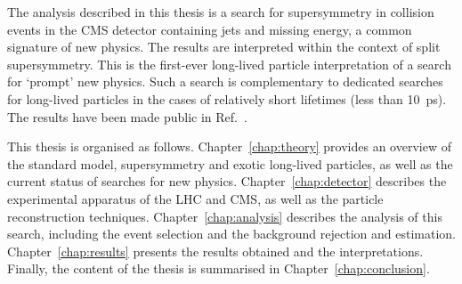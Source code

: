 The analysis described in this thesis is a search for supersymmetry in 
collision events in the CMS detector containing jets and missing energy, a 
common signature of new physics. The results are interpreted within the context 
of split supersymmetry. This is the first-ever long-lived particle 
interpretation of a search for `prompt' new physics. 
Such a search is complementary to dedicated searches for long-lived particles 
in the cases of relatively short lifetimes (less than 10~ps). 
The results have been made public in Ref.~\cite{alphat5}.


This thesis is organised as follows. Chapter~\ref{chap:theory} provides an 
overview of the standard model, supersymmetry and exotic long-lived particles, 
as well as the current status of searches for new physics. 
Chapter~\ref{chap:detector} describes the experimental apparatus of the LHC and 
CMS, as well as the particle reconstruction techniques. 
Chapter~\ref{chap:analysis} describes the analysis of this search, including 
the event selection and the background rejection and estimation. 
Chapter~\ref{chap:results} presents the results obtained and the 
interpretations. 
Finally, the content of the thesis is summarised in 
Chapter~\ref{chap:conclusion}.

